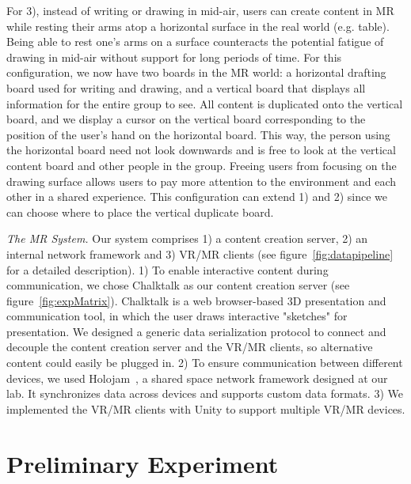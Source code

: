 \documentclass[sigchi-a]{acmart}
\begin{document}
For 3), instead of writing or drawing in mid-air, users can create content in MR
while resting their arms atop a horizontal surface in the real world (e.g. table). Being able to rest one's arms on a surface counteracts the potential fatigue of drawing in mid-air without support for long periods of time. For this configuration, we now have two boards in the MR world: a horizontal drafting board used for writing and drawing, and a vertical board that displays all information for the entire group to see. All content is duplicated onto the vertical board, and we display a cursor on the vertical board corresponding to the position of the user's hand on the horizontal board. This way, the person using the horizontal board need not look downwards and is free to look at the vertical content board and other people in the group. Freeing users from focusing on the drawing surface allows users to pay more attention to the environment and each other in a shared experience. This configuration can extend 1) and 2) since we can choose where to place the vertical duplicate board.

\textit{The MR System.} Our system comprises 1) a content creation server, 2) an internal network framework and 3) VR/MR clients (see figure~\ref{fig:datapipeline} for a detailed description). 1) To enable interactive content during communication, we chose Chalktalk as our content creation server (see figure~\ref{fig:expMatrix}). Chalktalk is a web browser-based 3D presentation and communication tool, 
in which the user draws interactive "sketches" for presentation. We designed a generic data serialization protocol to connect and decouple the content creation server and the VR/MR clients, so alternative content could easily be plugged in.
2) To ensure communication between different devices, we used Holojam~\cite{perlin2016future}, a shared space network framework designed at our lab.
It synchronizes data across devices and supports custom data formats.
3) We implemented the VR/MR clients with Unity to support multiple VR/MR devices.


\section{Preliminary Experiment}
\end{document}

